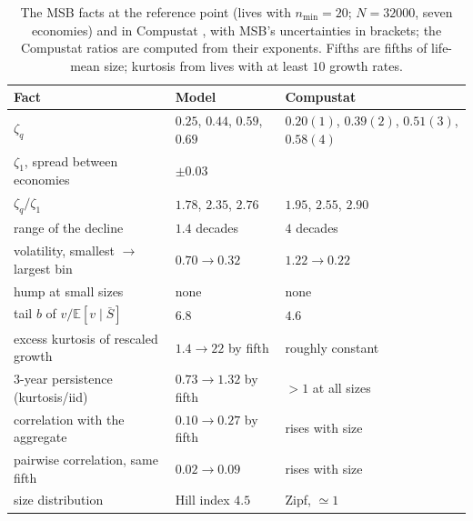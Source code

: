 \documentclass[pre,twocolumn,superscriptaddress,nofootinbib]{revtex4-2}
\newcommand{\E}{\mathbb E}
\newcommand{\Sb}{\bar S}
\begin{document}
\begin{table}[t]
\caption{The MSB facts at the reference point (lives with $n_{\min}=20$; $N=32000$, seven
economies) and in Compustat \cite{moran2024}, with MSB's uncertainties in brackets; the Compustat ratios
are computed from their exponents.  Fifths are fifths of
life-mean size; kurtosis from lives with at least $10$ growth rates.}
\label{tab:facts}
\begin{ruledtabular}
\begin{tabular}{lll}
Fact & Model & Compustat\\
\hline
$\zeta_q$ & $0.25$, $0.44$, $0.59$, $0.69$ & $0.20(1)$, $0.39(2)$, $0.51(3)$, $0.58(4)$\\
$\zeta_1$, spread between economies & $\pm0.03$ & \\
$\zeta_q/\zeta_1$ & $1.78$, $2.35$, $2.76$ & $1.95$, $2.55$, $2.90$\\
range of the decline & $1.4$ decades & $4$ decades\\
volatility, smallest $\to$ largest bin & $0.70\to0.32$ & $1.22\to0.22$\\
hump at small sizes & none & none\\
tail $b$ of $v/\E[v\mid\Sb]$ & $6.8$ & $4.6$\\
excess kurtosis of rescaled growth & $1.4\to22$ by fifth & roughly constant\\
3-year persistence (kurtosis/iid) & $0.73\to1.32$ by fifth & $>1$ at all sizes\\
correlation with the aggregate & $0.10\to0.27$ by fifth & rises with size\\
pairwise correlation, same fifth & $0.02\to0.09$ & rises with size\\
size distribution & Hill index $4.5$ & Zipf, $\simeq1$\\
\end{tabular}
\end{ruledtabular}
\end{table}
\end{document}
